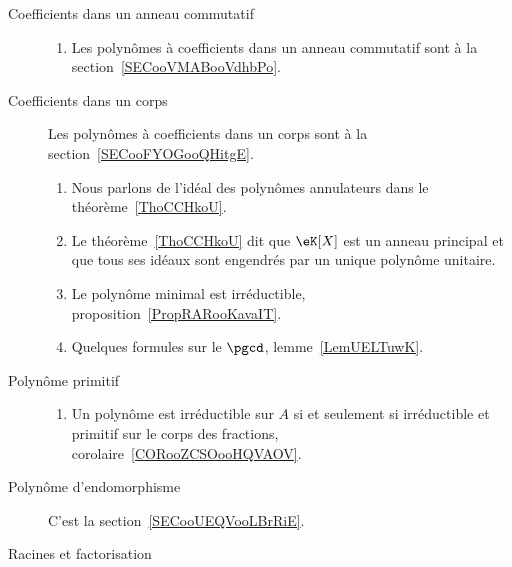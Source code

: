 \begin{description}
    \item[Coefficients dans un anneau commutatif]

        \begin{enumerate}
            \item
Les polynômes à coefficients dans un anneau commutatif  sont à la section~\ref{SECooVMABooVdhbPo}.
        \end{enumerate}


    \item[Coefficients dans un corps]
Les polynômes à coefficients dans un corps sont à la section~\ref{SECooFYOGooQHitgE}.
        \begin{enumerate}

\item
Nous parlons de l'idéal des polynômes annulateurs dans le théorème~\ref{ThoCCHkoU}.
            \item
                Le théorème~\ref{ThoCCHkoU} dit que \( \eK[X]\) est un anneau principal et que tous ses idéaux sont engendrés par un unique polynôme unitaire.
            \item
                Le polynôme minimal est irréductible, proposition~\ref{PropRARooKavaIT}.
            \item
                Quelques formules sur le \( \pgcd\), lemme~\ref{LemUELTuwK}.
        \end{enumerate}
    \item[Polynôme primitif]

        \begin{enumerate}
            \item
                Un polynôme est irréductible sur \( A\) si et seulement si irréductible et primitif sur le corps des fractions, corolaire~\ref{CORooZCSOooHQVAOV}.
        \end{enumerate}

    \item[Polynôme d'endomorphisme]
        C'est la section~\ref{SECooUEQVooLBrRiE}.

    \item[Racines et factorisation]


\end{description}
